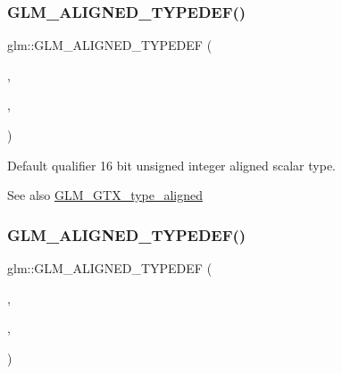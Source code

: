 \subsubsection{\texorpdfstring{G\+L\+M\+\_\+\+A\+L\+I\+G\+N\+E\+D\+\_\+\+T\+Y\+P\+E\+D\+E\+F()}{GLM\_ALIGNED\_TYPEDEF()}\hspace{0.1cm}{\footnotesize\ttfamily [114/209]}}
{\footnotesize\ttfamily glm\+::\+G\+L\+M\+\_\+\+A\+L\+I\+G\+N\+E\+D\+\_\+\+T\+Y\+P\+E\+D\+EF (\begin{DoxyParamCaption}\item[{\mbox{\hyperlink{group__gtc__type__precision_gae7a1571503f83d2264ddfa705a6b082a}{u16}}}]{,  }\item[{aligned\+\_\+u16}]{,  }\item[{2}]{ }\end{DoxyParamCaption})}

Default qualifier 16 bit unsigned integer aligned scalar type. \begin{DoxySeeAlso}{See also}
\mbox{\hyperlink{group__gtx__type__aligned}{G\+L\+M\+\_\+\+G\+T\+X\+\_\+type\+\_\+aligned}} 
\end{DoxySeeAlso}
\mbox{\label{group__gtx__type__aligned_ga197570e03acbc3d18ab698e342971e8f}} 
\subsubsection{\texorpdfstring{G\+L\+M\+\_\+\+A\+L\+I\+G\+N\+E\+D\+\_\+\+T\+Y\+P\+E\+D\+E\+F()}{GLM\_ALIGNED\_TYPEDEF()}\hspace{0.1cm}{\footnotesize\ttfamily [115/209]}}
{\footnotesize\ttfamily glm\+::\+G\+L\+M\+\_\+\+A\+L\+I\+G\+N\+E\+D\+\_\+\+T\+Y\+P\+E\+D\+EF (\begin{DoxyParamCaption}\item[{\mbox{\hyperlink{group__gtc__type__precision_ga54e837745059fd29017bed71cfa0a8db}{u32}}}]{,  }\item[{aligned\+\_\+u32}]{,  }\item[{4}]{ }\end{DoxyParamCaption})}

